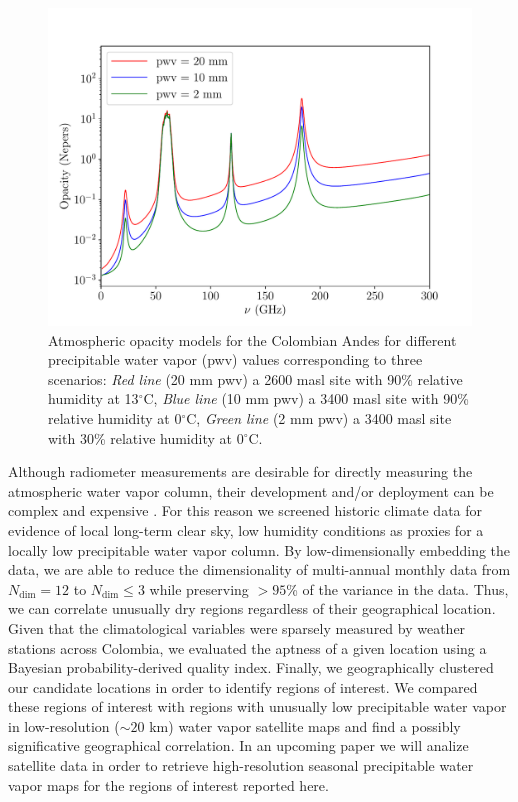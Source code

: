 \documentclass[12pt]{iopart}
\begin{document}
\begin{figure}
\begin{center}
\includegraphics[scale=0.5]{opac.pdf}
\caption{Atmospheric opacity models for the Colombian Andes for different precipitable water vapor (pwv) values corresponding to three scenarios: \textit{Red line} (20 mm pwv) a 2600 masl site with 90\% relative humidity at 13$^\circ$C, \textit{Blue line} (10 mm pwv) a 3400 masl site with 90\% relative humidity at 0$^\circ$C, \textit{Green line} (2 mm pwv) a 3400 masl site with 30\% relative humidity at 0$^\circ$C.}\label{opac}
\end{center}
\end{figure}

Although radiometer measurements are desirable for directly measuring the atmospheric water vapor column, their development and/or deployment can be complex and expensive \cite{radiopro,receiver}. For this reason we screened historic climate data for evidence of local long-term clear sky, low humidity conditions as proxies for a locally low precipitable water vapor column. By low-dimensionally embedding the data, we are able to reduce the dimensionality of multi-annual monthly data from $N_\mathrm{dim}=12$ to $N_\mathrm{dim}\le3$ while preserving $>95$\% of the variance in the data. Thus, we can correlate unusually dry regions regardless of their geographical location. Given that the climatological variables were sparsely measured by weather stations across Colombia, we evaluated the aptness of a given location using a Bayesian probability-derived quality index. Finally, we geographically clustered our candidate locations in order to identify regions of interest. We compared these regions of interest with regions with unusually low precipitable water vapor in low-resolution ($\sim20$ km) water vapor satellite maps \cite{suen2016} and find a possibly significative geographical correlation.  In an upcoming paper we will analize satellite data in order to retrieve high-resolution seasonal precipitable water vapor maps for the regions of interest reported here.\\
\end{document}
